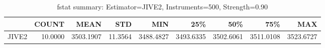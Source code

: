 \begin{table}[ht]
\centering
\caption{fstat summary: Estimator=JIVE2, Instruments=500, Strength=0.90}
\begin{tabular}{lrrrrrrrr}
\toprule
 & COUNT & MEAN & STD & MIN & 25\% & 50\% & 75\% & MAX \\
\midrule
JIVE2 & 10.0000 & 3503.1907 & 11.3564 & 3488.4827 & 3493.6335 & 3502.6061 & 3511.0108 & 3523.6727 \\
\bottomrule
\end{tabular}
\end{table}
